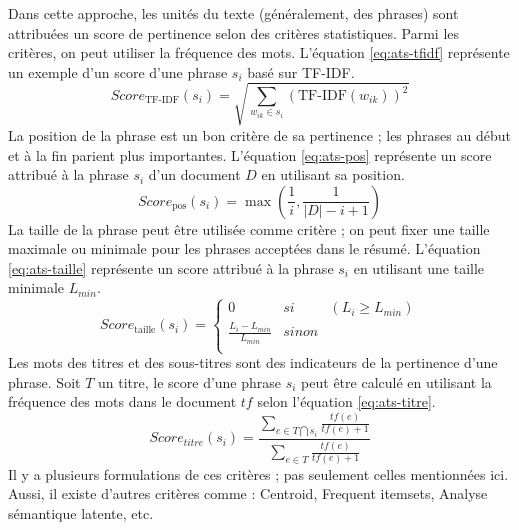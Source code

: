 \documentclass{KodeBook}
\begin{document}
Dans cette approche, les unités du texte (généralement, des phrases) sont attribuées un score de pertinence selon des critères statistiques.
Parmi les critères, on peut utiliser la fréquence des mots. 
L'équation \ref{eq:ats-tfidf} représente un exemple d'un score d'une phrase $s_i$ basé sur TF-IDF. 
\begin{equation}\label{eq:ats-tfidf}
Score_\text{TF-IDF}(s_i) = \sqrt{\sum\limits_{w_{ik} \in s_i} (\text{TF-IDF}(w_{ik}))^2}
\end{equation}
La position de la phrase est un bon critère de sa pertinence ; les phrases au début et à la fin parient plus importantes.
L'équation \ref{eq:ats-pos} représente un score attribué à la phrase $s_i$ d'un document $D$ en utilisant sa position.
\begin{equation}\label{eq:ats-pos}
Score_\text{pos}(s_i) = \max (\frac{1}{i}, \frac{1}{|D| - i + 1})
\end{equation}
La taille de la phrase peut être utilisée comme critère ; on peut fixer une taille maximale ou minimale pour les phrases acceptées dans le résumé.
L'équation \ref{eq:ats-taille} représente un score attribué à la phrase $s_i$ en utilisant une taille minimale $L_{min}$.
\begin{equation}\label{eq:ats-taille}
Score_\text{taille}(s_i) = \left\lbrace 
\begin{array}{lll}
0 & si & (L_i \geq L_{min}) \\
\frac{L_i - L_{min}}{L_{min}} & sinon & \\
\end{array}
\right.
\end{equation}
Les mots des titres et des sous-titres sont des indicateurs de la pertinence d'une phrase. 
Soit $T$ un titre, le score d'une phrase $s_i$ peut être calculé en utilisant la fréquence des mots dans le document $tf$ selon l'équation \ref{eq:ats-titre}.
\begin{equation}\label{eq:ats-titre}
Score_{titre}(s_i) = \frac{\sum_{e \in T \bigcap s_i}{\frac{tf(e)}{tf(e)+1}}}
{\sum_{e \in T}{\frac{tf(e)}{tf(e)+1}}}
\end{equation}
Il y a plusieurs formulations de ces critères ; pas seulement celles mentionnées ici. 
Aussi, il existe d'autres critères comme : Centroid, Frequent itemsets, Analyse sémantique latente, etc.
\end{document}
